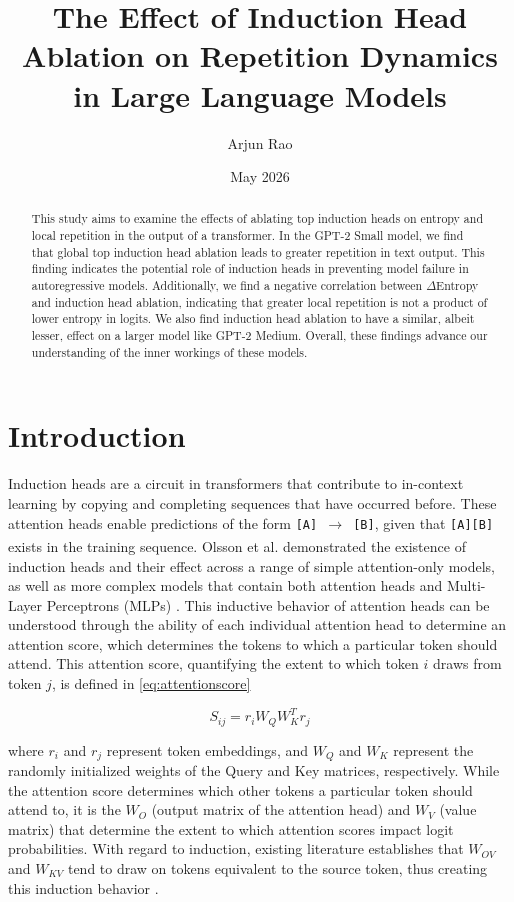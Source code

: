 \documentclass[twocolumn]{article}
\title{\vspace{-2cm}The Effect of Induction Head Ablation on Repetition Dynamics in Large Language Models}
\author{Arjun Rao}
\date{May 2026}
\begin{document}
\maketitle

\begin{abstract}
    This study aims to examine the effects of ablating top induction heads on entropy and local repetition in the output of a transformer. In the GPT-2 Small model, we find that global top induction head ablation leads to greater repetition in text output. This finding indicates the potential role of induction heads in preventing model failure in autoregressive models. Additionally, we find a negative correlation between $\Delta$Entropy and induction head ablation, indicating that greater local repetition is not a product of lower entropy in logits. We also find induction head ablation to have a similar, albeit lesser, effect on a larger model like GPT-2 Medium. Overall, these findings advance our understanding of the inner workings of these models.      
\end{abstract}

\section{Introduction}

Induction heads are a circuit in transformers that contribute to in-context learning by copying and completing sequences that have occurred before. These attention heads enable predictions of the form \texttt{[A] $\xrightarrow[]{}$ [B]}, given that \texttt{[A][B]} exists in the training sequence. Olsson et al. demonstrated the existence of induction heads and their effect across a range of simple attention-only models, as well as more complex models that contain both attention heads and Multi-Layer Perceptrons (MLPs) \cite{olsson2022incontextlearninginductionheads}. This inductive behavior of attention heads can be understood through the ability of each individual attention head to determine an attention score, which determines the tokens to which a particular token should attend. This attention score, quantifying the extent to which token $i$ draws from token $j$, is defined in \ref{eq:attentionscore}

\begin{equation}
    S_{ij} = r_i W_Q W_K^T r_j
    \label{eq:attentionscore}
\end{equation}

where $r_i$ and $r_j$ represent token embeddings, and $W_Q$ and $W_K$ represent the randomly initialized weights of the Query and Key matrices, respectively. While the attention score determines which other tokens a particular token should attend to, it is the $W_O$ (output matrix of the attention head) and $W_V$ (value matrix) that determine the extent to which attention scores impact logit probabilities. With regard to induction, existing literature establishes that $W_{OV}$ and $W_{KV}$ tend to draw on tokens equivalent to the source token, thus creating this induction behavior \cite{elhage2021mathematical}. \\
\end{document}
